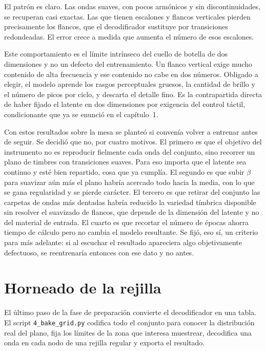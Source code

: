 El patrón es claro. Las ondas suaves, con pocos armónicos y sin
discontinuidades, se recuperan casi exactas. Las que tienen escalones y flancos
verticales pierden precisamente los flancos, que el decodificador sustituye por
transiciones redondeadas. El error crece a medida que aumenta el número de
esos escalones.

Este comportamiento es el límite intrínseco del cuello de botella de dos
dimensiones y no un defecto del entrenamiento. Un flanco vertical exige mucho
contenido de alta frecuencia y ese contenido no cabe en dos números. Obligado a
elegir, el modelo aprende los rasgos perceptuales gruesos, la cantidad
de brillo y el número de picos por ciclo, y descarta el detalle fino. Es la
contrapartida directa de haber fijado el latente en dos dimensiones por
exigencia del control táctil, condicionante que ya se enunció en el capítulo~1.

Con estos resultados sobre la mesa se planteó si convenía volver a entrenar
antes de seguir. Se decidió que no, por cuatro motivos. El primero es que el
objetivo del instrumento no es reproducir fielmente cada onda del conjunto, sino
recorrer un plano de timbres con transiciones suaves. Para eso importa que el
latente sea continuo y esté bien repartido, cosa que ya cumplía. El segundo es
que subir $\beta$ para suavizar aún más el plano habría acercado todo hacia la
media, con lo que se gana regularidad y se pierde carácter. El tercero es que
retirar del conjunto las carpetas de ondas más dentadas habría reducido la
variedad tímbrica disponible sin resolver el suavizado de flancos, que depende
de la dimensión del latente y no del material de entrada. El cuarto es que
recortar el número de épocas ahorra tiempo de cálculo pero no cambia el modelo
resultante. Se fijó, eso sí, un criterio para más adelante: si al
escuchar el resultado apareciera algo objetivamente defectuoso, se reentrenaría
entonces con ese dato y no antes.

\section{Horneado de la rejilla}
\label{sec:rejilla}

El último paso de la fase de preparación convierte el decodificador en una
tabla. El script \texttt{4\_\allowbreak bake\_\allowbreak grid.py} codifica todo el conjunto para conocer
la distribución real del plano, fija los límites de la zona que interesa
muestrear, decodifica una onda en cada nodo de una rejilla regular y exporta el
resultado.

